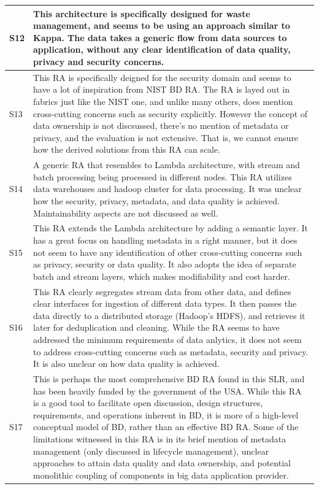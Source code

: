 \documentclass[review]{elsarticle}
\begin{document}
\begin{longtable}{|p{0.5cm}|p{11cm}|}
        \hline
        S12 & This architecture is specifically designed for waste management, and seems to be using an approach similar to Kappa. The data takes a generic flow from data sources to application, without any clear identification of data quality, privacy and security concerns.    \\
        \hline
        S13 & This RA is specifically deigned for the security domain and seems to have a lot of inspiration from NIST BD RA. The RA is layed out in fabrics just like the NIST one, and unlike many others, does mention cross-cutting concerns such as security explicitly. However the concept of data ownership is not discsussed, there's no mention of metadata or privacy, and the evaluation is not extensive. That is, we cannot ensure how the derived solutions from this RA can scale.    \\
        \hline
        S14 & A generic RA that resembles to Lambda architecture, with stream and batch processing being processed in different nodes. This RA utilizes data warehouses and hadoop cluster for data processing. It was unclear how the security, privacy, metadata, and data quality is achieved. Maintainability aspects are not discussed as well. \\
        \hline
        S15 & This RA extends the Lambda architecture by adding a semantic layer. It has a great focus on handling metadata in a right manner, but it does not seem to have any identification of other cross-cutting concerns such as privacy, security or data quality. It also adopts the idea of separate batch and stream layers, which makes modifiability and cost harder. \\
        \hline
        S16 & This RA clearly segregates stream data from other data, and defines clear interfaces for ingestion of different data types. It then passes the data directly to a distributed storage (Hadoop's HDFS), and retrieves it later for deduplication and cleaning. While the RA seems to have addressed the minimum requirements of data anlytics, it does not seem to address cross-cutting concerns such as metadata, security and privacy. It is also unclear on how data quality is achieved. \\
        \hline
        S17 & This is perhaps the most comprehensive BD RA found in this SLR, and has been heavily funded by the government of the USA. While this RA is a good tool to facilitate open discussion, design structures, requirements, and operations inherent in BD, it is more of a high-level conceptual model of BD, rather than an effective BD RA. Some of the limitations witnessed in this RA is in its brief mention of metadata management (only discussed in lifecycle management), unclear approaches to attain data quality and data ownership, and potential monolithic coupling of components in big data application provider. \\

\end{longtable}
\end{document}
